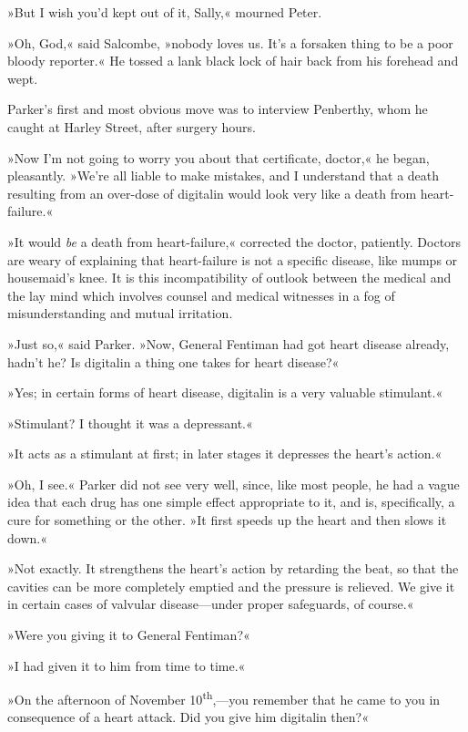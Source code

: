 »But I wish you'd kept out of it, Sally,« mourned Peter.

»Oh, God,« said Salcombe, »nobody loves us. It's a forsaken thing to be a poor bloody reporter.« He tossed a lank black lock of hair back from his forehead and wept.

Parker's first and most obvious move was to interview Penberthy, whom he caught at Harley Street, after surgery hours.

»Now I'm not going to worry you about that certificate, doctor,« he began, pleasantly. »We're all liable to make mistakes, and I understand that a death resulting from an over-dose of digitalin would look very like a death from heart-failure.«

»It would \textit{be} a death from heart-failure,« corrected the doctor, patiently. Doctors are weary of explaining that heart-failure is not a specific disease, like mumps or housemaid's knee. It is this incompatibility of outlook between the medical and the lay mind which involves counsel and medical witnesses in a fog of misunderstanding and mutual irritation.

»Just so,« said Parker. »Now, General Fentiman had got heart disease already, hadn't he? Is digitalin a thing one takes for heart disease?«

»Yes; in certain forms of heart disease, digitalin is a very valuable stimulant.«

»Stimulant? I thought it was a depressant.«

»It acts as a stimulant at first; in later stages it depresses the heart's action.«

»Oh, I see.« Parker did not see very well, since, like most people, he had a vague idea that each drug has one simple effect appropriate to it, and is, specifically, a cure for something or the other. »It first speeds up the heart and then slows it down.«

»Not exactly. It strengthens the heart's action by retarding the beat, so that the cavities can be more completely emptied and the pressure is relieved. We give it in certain cases of valvular disease—under proper safeguards, of course.«

»Were you giving it to General Fentiman?«

»I had given it to him from time to time.«

»On the afternoon of November  10\textsuperscript{th},—you remember that he came to you in consequence of a heart attack. Did you give him digitalin then?«


